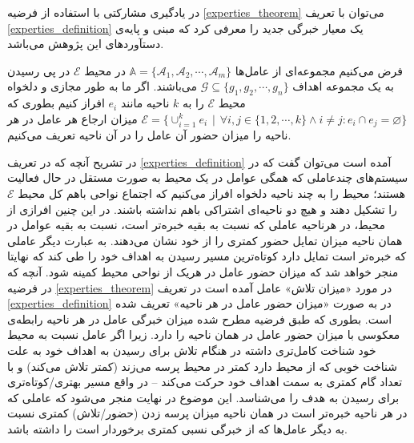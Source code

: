 در یادگیری مشارکتی با استفاده از فرضیه
\ref{experties_theorem}
می‌توان با تعریف
\ref{experties_definition}
یک معیار خبرگی جدید را معرفی کرد که مبنی و پایه‌ی دستآوردهای این پژوهش می‌باشد.

\begin{definition}\setstretch{\thebaselinestretch}\label{experties_definition}
فرض می‌کنیم مجموعه‌ای از عامل‌ها
$\mathbb{A} = \{\mathcal{A}_1, \mathcal{A}_2, \cdots, \mathcal{A}_m\}$
در محیط $\mathcal{E}$ در پی رسیدن به یک مجموعه اهداف
$\mathcal{G} \subseteq \{g_1, g_2, \cdots, g_n\}$
می‌باشند. اگر ما به طور مجازی و دلخواه محیط $\mathcal{E}$ را به $k$ ناحیه‌ مانند $e_i$ افراز کنیم بطوری که
$\mathcal{E} = \{\cup_{i=1}^{k} e_i\hspace{5pt}|\hspace{5pt}\forall i,j\in\{1,2,\cdots,k\} \land i \neq j : e_i \cap e_j = \varnothing\}$
میزان ارجاع هر عامل در هر ناحیه را میزان حضور آن عامل را در آن ناحیه تعریف می‌کنیم.
\end{definition}

در تشریح آنچه که در تعریف
\ref{experties_definition}
آمده است می‌توان گفت که در سیستم‌های چندعاملی که همگی عوامل در یک محیط به صورت مستقل در حال فعالیت هستند؛ محیط را به چند ناحیه دلخواه افراز می‌کنیم که اجتماع نواحی باهم کل محیط $\mathcal{E}$ را تشکیل دهند و هیچ دو ناحیه‌ای اشتراکی باهم نداشته باشند. در این چنین افرازی از محیط، در هرناحیه عاملی که نسبت به بقیه خبره‌تر است، نسبت به بقیه عوامل در همان ناحیه میزان تمایل حضور کمتری را از خود نشان می‌دهند. به عبارت دیگر عاملی که خبره‌تر است تمایل دارد کوتاه‌ترین مسیر رسیدن به اهداف خود را طی کند که نهایتا منجر خواهد شد که میزان حضور عامل در هریک از نواحی محیط کمینه شود.
آنچه که در فرضیه
\ref{experties_theorem}
در مورد «میزان تلاش» عامل آمده است در تعریف
\ref{experties_definition}
در به صورت «میزان حضور عامل در هر ناحیه» تعریف شده است. بطوری که طبق فرضیه مطرح شده میزان خبرگی عامل در هر ناحیه رابطه‌ی معکوسی با میزان حضور عامل در همان ناحیه را دارد. زیرا اگر عامل نسبت به محیط خود شناخت کامل‌تری داشته در هنگام تلاش برای رسیدن به اهداف خود به علت شناخت خوبی که از محیط دارد کمتر در محیط پرسه می‌زند (کمتر تلاش می‌کند) و با تعداد گام کمتری به سمت اهداف خود حرکت می‌کند -- در واقع مسیر بهتری/کوتاه‌تری برای رسیدن به هدف را می‌شناسد. این موضوع در نهایت منجر می‌شود که عاملی که در هر ناحیه خبره‌تر است در همان ناحیه میزان پرسه زدن (حضور/تلاش) کمتری نسبت به دیگر عامل‌ها که از خبرگی نسبی کمتری برخوردار است را داشته باشد.

